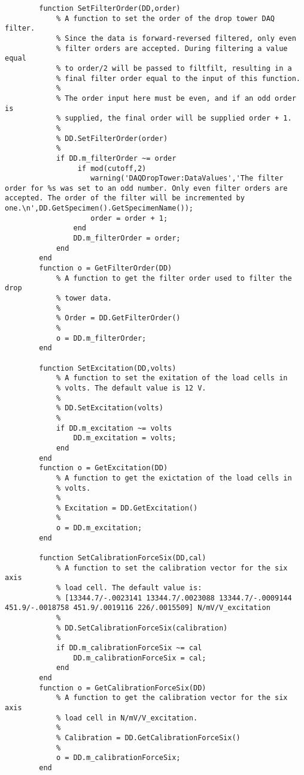 \begin{lstlisting}
        function SetFilterOrder(DD,order)
            % A function to set the order of the drop tower DAQ filter.
            % Since the data is forward-reversed filtered, only even 
            % filter orders are accepted. During filtering a value equal
            % to order/2 will be passed to filtfilt, resulting in a
            % final filter order equal to the input of this function.
            %
            % The order input here must be even, and if an odd order is
            % supplied, the final order will be supplied order + 1.
            %
            % DD.SetFilterOrder(order)
            %
            if DD.m_filterOrder ~= order
                 if mod(cutoff,2)
                    warning('DAQDropTower:DataValues','The filter order for %s was set to an odd number. Only even filter orders are accepted. The order of the filter will be incremented by one.\n',DD.GetSpecimen().GetSpecimenName());
                    order = order + 1;
                end
                DD.m_filterOrder = order;
            end
        end
        function o = GetFilterOrder(DD)
            % A function to get the filter order used to filter the drop
            % tower data.
            %
            % Order = DD.GetFilterOrder()
            %
            o = DD.m_filterOrder;
        end
        
        function SetExcitation(DD,volts)
            % A function to set the exitation of the load cells in 
            % volts. The default value is 12 V.
            % 
            % DD.SetExcitation(volts)
            %
            if DD.m_excitation ~= volts
                DD.m_excitation = volts;
            end
        end
        function o = GetExcitation(DD)
            % A function to get the exictation of the load cells in 
            % volts.
            %
            % Excitation = DD.GetExcitation()
            %
            o = DD.m_excitation;
        end        
        
        function SetCalibrationForceSix(DD,cal)
            % A function to set the calibration vector for the six axis
            % load cell. The default value is:
            % [13344.7/-.0023141 13344.7/.0023088 13344.7/-.0009144 451.9/-.0018758 451.9/.0019116 226/.0015509] N/mV/V_excitation
            %
            % DD.SetCalibrationForceSix(calibration)
            %
            if DD.m_calibrationForceSix ~= cal
                DD.m_calibrationForceSix = cal;
            end            
        end
        function o = GetCalibrationForceSix(DD)
            % A function to get the calibration vector for the six axis
            % load cell in N/mV/V_excitation.
            %
            % Calibration = DD.GetCalibrationForceSix()
            %
            o = DD.m_calibrationForceSix;
        end
        

\end{lstlisting}
